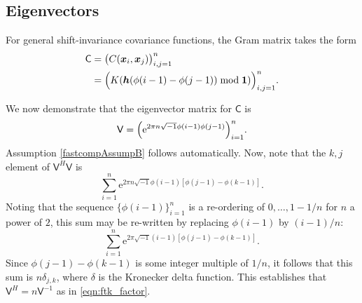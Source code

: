 \documentclass[twocolumn]{svjour3}          %
\newcommand{\bm}[1]{\boldsymbol{#1}}
\newcommand{\vh}{\bm{h}}
\newcommand{\vx}{\bm{x}}
\newcommand{\vone}{\bm{1}}
\newcommand{\mC}{\mathsf{C}}
\newcommand{\mV}{\mathsf{V}}
\newcommand{\me}{\mathrm{e}}
\begin{document}
\subsection{Eigenvectors}
For general shift-invariance covariance functions, the Gram matrix takes the form
\begin{align*}
\mC &= \bigl ( C(\vx_i, \vx_j) \bigr)_{i, j = 1}^n \\
& = \Bigl ( K(\vh(\phi(i-1) - \phi(j-1)) \bmod \vone ) \Bigr)_{i, j = 1}^n.
\end{align*}

We now demonstrate that the eigenvector matrix for $\mC$ is 
\begin{align} \label{latticeVdef}
\mV = \Bigl ( \me^{2 \pi n \sqrt{-1} \phi(i-1)\phi(j-1)} \Bigr)_{i = 1}^n.
\end{align}
Assumption \eqref{fastcompAssumpB} follows automatically.
Now, note that the $k,j$ element of $\mV^H\mV$ is
\begin{equation*}
\sum_{i=1}^n \me^{2 \pi n \sqrt{-1} \phi(i-1)[\phi(j-1) - \phi(k-1)]} .
\end{equation*}
Noting that the sequence $\{\phi(i-1)\}_{i=1}^n$ is a re-ordering of $0, \ldots, 1-1/n$ for $n$ a power of $2$, this sum may be re-written by replacing $\phi(i-1)$ by $(i-1)/n$:
\begin{equation*}
\sum_{i=1}^n \me^{2 \pi \sqrt{-1} (i-1)[\phi(j-1) - \phi(k-1)]}.
\end{equation*}
Since $\phi(j-1) - \phi(k-1)$ is some integer multiple of $1/n$, it follows that this sum is $n \delta_{j,k}$, where $\delta$ is the Kronecker delta function.  This establishes that $\mV^H = n \mV^{-1}$ as in \eqref{eqn:ftk_factor}.
\end{document}
